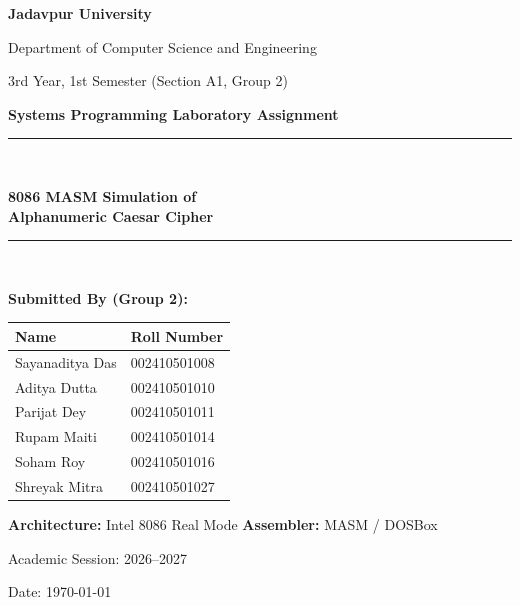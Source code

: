 \documentclass[11pt,a4paper]{article}
\begin{document}
\begin{titlepage}
    \centering
    \vspace*{1cm}

    {\LARGE\bfseries Jadavpur University\par}
    \vspace{0.3cm}
    {\Large Department of Computer Science and Engineering\par}
    \vspace{0.2cm}
    {\normalsize 3rd Year, 1st Semester (Section A1, Group 2)\par}
    \vspace{1.5cm}

    {\large\textbf{Systems Programming Laboratory Assignment}\par}
    \vspace{0.4cm}
    \rule{0.85\linewidth}{1.2pt}\\[0.4cm]
    {\huge\bfseries 8086 MASM Simulation of\\[0.25cm] Alphanumeric Caesar Cipher\par}
    \rule{0.85\linewidth}{1.2pt}\\[1.5cm]

    {\large\textbf{Submitted By (Group 2):}\par}
    \vspace{0.4cm}
    \begin{tabular}{ll}
        \toprule
        \textbf{Name} & \textbf{Roll Number} \\
        \midrule
        Sayanaditya Das & 002410501008 \\
        Aditya Dutta    & 002410501010 \\
        Parijat Dey     & 002410501011 \\
        Rupam Maiti     & 002410501014 \\
        Soham Roy       & 002410501016 \\
        Shreyak Mitra   & 002410501027 \\
        \bottomrule
    \end{tabular}

    \vfill
    {\normalsize\textbf{Architecture:} Intel 8086 Real Mode \quad\textbar\quad \textbf{Assembler:} MASM / DOSBox\par}
    \vspace{0.2cm}
    {\normalsize Academic Session: 2026--2027\par}
    {\normalsize Date: \today\par}
\end{titlepage}
\end{document}
